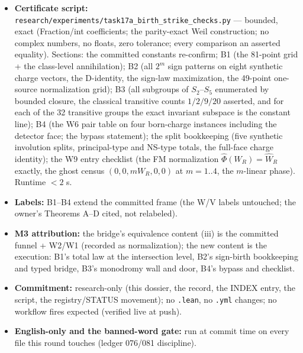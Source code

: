 \documentclass[11pt]{article}
\newcommand{\WR}{W_R}
\begin{document}
\begin{itemize}
\item \textbf{Certificate script:}
\texttt{research/experiments/task17a\_birth\_strike\_checks.py} --- bounded,
exact (Fraction/int coefficients; the parity-exact Weil construction; no
complex numbers, no floats, zero tolerance; every comparison an asserted
equality). Sections: the committed constants re-confirm; B1 (the 81-point
grid + the class-level annihilation); B2 (all $2^m$ sign patterns on eight
synthetic charge vectors, the D-identity, the sign-law maximization, the
49-point one-source normalization grid); B3 (all subgroups of $S_2$--$S_5$
enumerated by bounded closure, the classical transitive counts $1/2/9/20$
asserted, and for each of the 32 transitive groups the exact invariant
subspace is the constant line); B4 (the W6 pair table on four born-charge
instances including the detector face; the bypass statement); the split
bookkeeping (five synthetic involution splits, principal-type and NS-type
totals, the full-face charge identity); the W9 entry checklist (the FM
normalization $\widehat\Phi(\WR) = \widehat\WR$ exactly, the ghost census
$(0,0,m\WR,0,0)$ at $m = 1..4$, the $m$-linear phase). Runtime $< 2$ s.
\item \textbf{Labels:} B1--B4 extend the committed frame (the W/V labels
untouched; the owner's Theorems A--D cited, not relabeled).
\item \textbf{M3 attribution:} the bridge's equivalence content (iii) is the
committed funnel + W2/W1 (recorded as normalization); the new content is the
execution: B1's total law at the intersection level, B2's sign-birth
bookkeeping and typed bridge, B3's monodromy wall and door, B4's bypass and
checklist.
\item \textbf{Commitment:} research-only (this dossier, the record, the
INDEX entry, the script, the registry/STATUS movement); no \texttt{.lean}, no
\texttt{.yml} changes; no workflow fires expected (verified live at push).
\item \textbf{English-only and the banned-word gate:} run at commit time on
every file this round touches (ledger 076/081 discipline).
\end{itemize}
\end{document}

